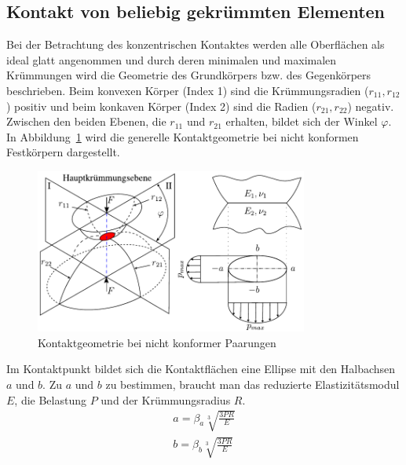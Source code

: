 \subsection{Kontakt von beliebig gekrümmten Elementen}
\label{sub:kontakt_von_beliebig_gekruemmten_elementen}

Bei der Betrachtung des konzentrischen Kontaktes werden alle Oberflächen als ideal glatt angenommen und durch deren minimalen und maximalen Krümmungen wird die Geometrie des Grundkörpers bzw. des Gegenkörpers beschrieben.
Beim konvexen Körper (Index 1) sind die Krümmungsradien ($r_{11}, r_{12}$) positiv und beim konkaven Körper (Index 2) sind die Radien ($r_{21}, r_{22}$) negativ.
Zwischen den beiden Ebenen, die $r_{11}$ und $r_{21}$ erhalten, bildet sich der Winkel $\varphi$.
In Abbildung~\ref{fig:kontaktgeometrie_nichtkonforme_kontakte} wird die generelle Kontaktgeometrie bei nicht konformen Festkörpern dargestellt.
\begin{figure}[htb]
    \centering
    \includegraphics[width=0.8\textwidth]{./images/hertzsche_pressung.pdf}
    \caption{Kontaktgeometrie bei nicht konformer Paarungen\cite{psm}}
    \label{fig:kontaktgeometrie_nichtkonforme_kontakte}
\end{figure}
%
Im Kontaktpunkt bildet sich die Kontaktflächen eine Ellipse mit den Halbachsen $a$ und $b$.
Zu $a$ und $b$ zu bestimmen, braucht man das reduzierte Elastizitätsmodul $E$, die Belastung $P$ und der Krümmungsradius $R$.
\begin{align}
    a = \beta_a  \sqrt[3]{\frac{3  P  R}{E}} \label{eq:laenge_a} \\
    b = \beta_b  \sqrt[3]{\frac{3  P  R}{E}} \label{eq:laenge_b}
\end{align}
